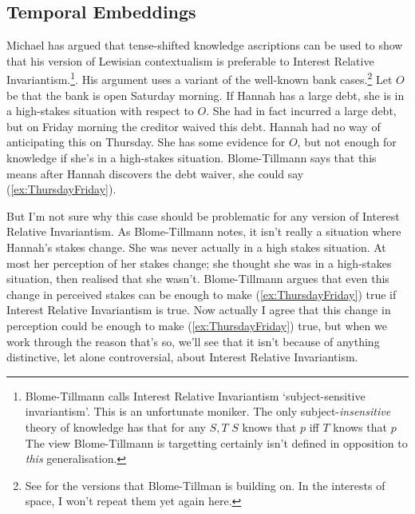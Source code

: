 \subsection{Temporal Embeddings}

Michael \cite{MBT2009} has argued that tense-shifted knowledge ascriptions can be used to show that his version of Lewisian contextualism is preferable to Interest Relative Invariantism.\footnote{Blome-Tillmann calls Interest Relative Invariantism `subject-sensitive invariantism'. This is an unfortunate moniker. The only subject-\textit{insensitive} theory of knowledge has that for any \(S, T\) \(S\) knows that \(p\) iff \(T\) knows that \(p\) The view Blome-Tillmann is targetting certainly isn't defined in opposition to \textit{this} generalisation.}. His argument uses a variant of the well-known bank cases.\footnote{See \cite{Stanley2005-STAKAP} for the versions that Blome-Tillman is building on. In the interests of space, I won't repeat them yet again here.} Let \(O\) be that the bank is open Saturday morning. If Hannah has a large debt, she is in a high-stakes situation with respect to \(O\). She had in fact incurred a large debt, but on Friday morning the creditor waived this debt. Hannah had no way of anticipating this on Thursday. She has some evidence for \(O\), but not enough for knowledge if she's in a high-stakes situation. Blome-Tillmann says that this means after Hannah discovers the debt waiver, she could say (\ref{ex:ThursdayFriday}).


\noindent But I'm not sure why this case should be problematic for any version of Interest Relative Invariantism. As Blome-Tillmann notes, it isn't really a situation where Hannah's stakes change. She was never actually in a high stakes situation. At most her perception of her stakes change; she thought she was in a high-stakes situation, then realised that she wasn't. Blome-Tillmann argues that even this change in perceived stakes can be enough to make (\ref{ex:ThursdayFriday}) true if Interest Relative Invariantism is true. Now actually I agree that this change in perception could be enough to make (\ref{ex:ThursdayFriday}) true, but when we work through the reason that's so, we'll see that it isn't because of anything distinctive, let alone controversial, about Interest Relative Invariantism.

